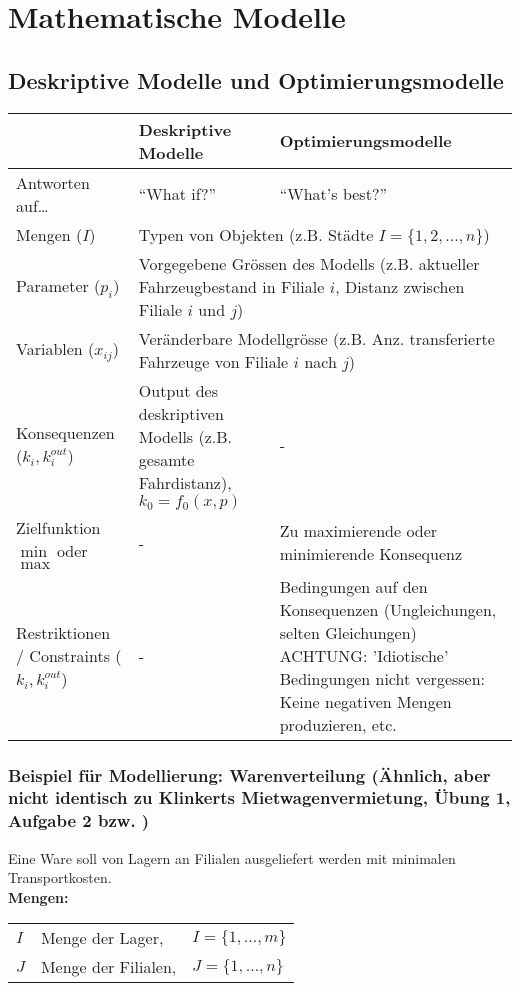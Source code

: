 \section{Mathematische Modelle }
\subsection{Deskriptive Modelle und Optimierungsmodelle }
  \begin{tabular}{|p{3.7cm}|p{7cm}|p{7cm}|}
    \hline
    & \textbf{Deskriptive Modelle}
    & \textbf{Optimierungsmodelle} \\
    \hline
    \hline
    Antworten auf\ldots
      & ``What if?''
      & ``What's best?'' \\
    \hline
    Mengen ($I$)
      & \multicolumn{2}{l|}{Typen von Objekten (z.B. Städte $I = \{1,2,\ldots,n\}$)} \\
    \hline
    Parameter ($p_i$)
      & \multicolumn{2}{p{14cm}|}{Vorgegebene Grössen des Modells (z.B. aktueller Fahrzeugbestand in Filiale $i$, Distanz zwischen Filiale $i$ und $j$)} \\
    \hline
    Variablen ($x_{ij}$)
      & \multicolumn{2}{l|}{Veränderbare Modellgrösse (z.B. Anz. transferierte Fahrzeuge von Filiale $i$ nach $j$)} \\
    \hline
    Konsequenzen ($k_{i}, k_i^{out}$)
      & Output des deskriptiven Modells (z.B. gesamte Fahrdistanz), $k_0 = f_0(x,p)$ 
      & -\\
    \hline
    Zielfunktion $\min$ oder $\max$
      & - 
      & Zu maximierende oder minimierende Konsequenz\\
    \hline
    Restriktionen / Constraints ($k_{i}, k_i^{out}$)
      & - 
      & Bedingungen auf den Konsequenzen (Ungleichungen, selten Gleichungen) ACHTUNG: 'Idiotische' Bedingungen nicht vergessen: Keine negativen Mengen produzieren, etc.\\
    \hline
  \end{tabular}
  
  \subsubsection{Beispiel für Modellierung: Warenverteilung (Ähnlich, aber nicht identisch zu Klinkerts Mietwagenvermietung, Übung 1, Aufgabe 2 bzw. )}
  Eine Ware soll von Lagern an Filialen ausgeliefert werden mit minimalen Transportkosten.\\
  
  \textbf{Mengen:}\\
  \begin{tabular}{lll}
    $I$ & Menge der Lager, &$I = \{1, \ldots, m\}$\\
    $J$ & Menge der Filialen, &$J = \{1, \ldots, n\}$
  \end{tabular}\\
  
